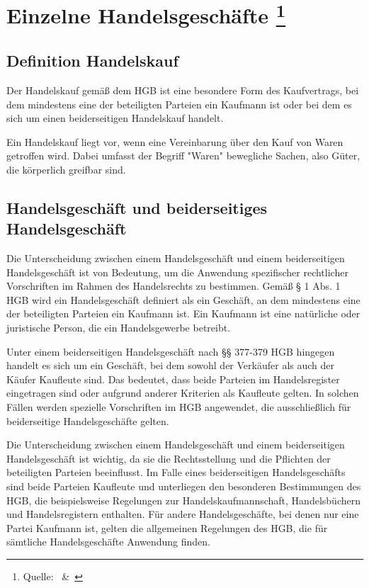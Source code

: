 
\chapter[Einzelne Handelsgeschäfte]{Einzelne Handelsgeschäfte \footnote{Quelle:~\cite{Handelsrecht} \&~\cite{Großkommentar_HGB}}}

\section{Definition Handelskauf}
Der Handelskauf gemäß dem HGB ist eine besondere Form des Kaufvertrags, bei dem mindestens eine der beteiligten Parteien ein Kaufmann ist oder bei dem es sich um einen beiderseitigen Handelskauf handelt.

Ein Handelskauf liegt vor, wenn eine Vereinbarung über den Kauf von Waren getroffen wird. Dabei umfasst der Begriff "Waren" bewegliche Sachen, also Güter, die körperlich greifbar sind.


\section{Handelsgeschäft und beiderseitiges Handelsgeschäft}
Die Unterscheidung zwischen einem Handelsgeschäft und einem beiderseitigen Handelsgeschäft ist von Bedeutung, um die Anwendung spezifischer rechtlicher Vorschriften im Rahmen des Handelsrechts zu bestimmen. Gemäß § 1 Abs. 1 HGB wird ein Handelsgeschäft definiert als ein Geschäft, an dem mindestens eine der beteiligten Parteien ein Kaufmann ist. Ein Kaufmann ist eine natürliche oder juristische Person, die ein Handelsgewerbe betreibt.

Unter einem beiderseitigen Handelsgeschäft nach §§ 377-379 HGB hingegen handelt es sich um ein Geschäft, bei dem sowohl der Verkäufer als auch der Käufer Kaufleute sind. Das bedeutet, dass beide Parteien im Handelsregister eingetragen sind oder aufgrund anderer Kriterien als Kaufleute gelten. In solchen Fällen werden spezielle Vorschriften im HGB angewendet, die ausschließlich für beiderseitige Handelsgeschäfte gelten.

Die Unterscheidung zwischen einem Handelsgeschäft und einem beiderseitigen Handelsgeschäft ist wichtig, da sie die Rechtsstellung und die Pflichten der beteiligten Parteien beeinflusst. Im Falle eines beiderseitigen Handelsgeschäfts sind beide Parteien Kaufleute und unterliegen den besonderen Bestimmungen des HGB, die beispielsweise Regelungen zur Handelskaufmannschaft, Handelsbüchern und Handelsregistern enthalten. Für andere Handelsgeschäfte, bei denen nur eine Partei Kaufmann ist, gelten die allgemeinen Regelungen des HGB, die für sämtliche Handelsgeschäfte Anwendung finden.

